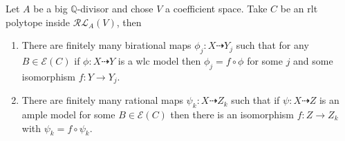 \documentclass[a4paper,12pt]{amsart}
\begin{document}
	\begin{theorem}\label{weak finiteness}
		Let $A$ be a big $\mathbb{Q}$-divisor and chose $V$ a coefficient space. Take $C$ be an rlt polytope inside $\mathcal{RL}_{A}(V)$, then
		
		\begin{enumerate}
			\item There are finitely many birational maps $\phi_{j}: X \dashrightarrow Y_{j}$ such that for any $B \in \mathcal{E}(C)$ if $\phi: X \dashrightarrow Y$ is a wlc model then $\phi_{j}=f \circ \phi$ for some $j$ and some isomorphism $f: Y \to Y_{j}$. \\
			\item There are finitely many rational maps $\psi_{k}: X \dashrightarrow Z_{k}$ such that if $\psi:X \dashrightarrow Z$ is an ample model for some $B \in \mathcal{E}(C)$ then there is an isomorphism $f:Z \to Z_{k}$ with $\psi_{k}=f \circ \psi_{k}$.
		\end{enumerate}
	\end{theorem}
	
\end{document}
